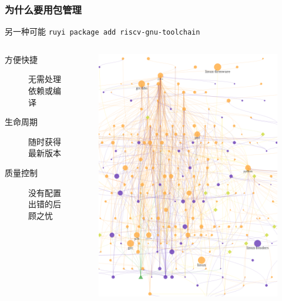 \documentclass{ctexbeamer}
\begin{document}
\begin{frame}
  \frametitle{为什么要用包管理}
  \begin{exampleblock}{另一种可能}
    \texttt{ruyi package add riscv-gnu-toolchain}
  \end{exampleblock}
  \begin{columns}
    \begin{column}{0.65\linewidth}
      \begin{description}
        \item[方便快捷] 无需处理依赖\footnotemark[1]或编译
        \item[生命周期] 随时获得最新版本
        \item[质量控制] 没有配置出错的后顾之忧
      \end{description}
    \end{column}
    \begin{column}{0.35\linewidth}
      \begin{figure}
        \includegraphics[width=\linewidth]{./pacviz.png}
      \end{figure}
    \end{column}
  \end{columns}
\end{frame}
\end{document}
